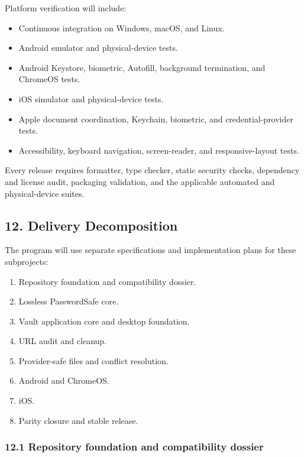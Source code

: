 \documentclass[
  letterpaper,
]{article}
\providecommand{\tightlist}{%
  \setlength{\itemsep}{0pt}\setlength{\parskip}{0pt}}
\begin{document}
Platform verification will include:

\begin{itemize}
\tightlist
\item
  Continuous integration on Windows, macOS, and Linux.
\item
  Android emulator and physical-device tests.
\item
  Android Keystore, biometric, Autofill, background termination, and ChromeOS tests.
\item
  iOS simulator and physical-device tests.
\item
  Apple document coordination, Keychain, biometric, and credential-provider tests.
\item
  Accessibility, keyboard navigation, screen-reader, and responsive-layout tests.
\end{itemize}

Every release requires formatter, type checker, static security checks, dependency and license audit, packaging
validation, and the applicable automated and physical-device suites.

\subsection{12. Delivery Decomposition}\label{12-delivery-decomposition}

The program will use separate specifications and implementation plans for these subprojects:

\begin{enumerate}
\def\labelenumi{\arabic{enumi}.}
\tightlist
\item
  Repository foundation and compatibility dossier.
\item
  Lossless PasswordSafe core.
\item
  Vault application core and desktop foundation.
\item
  URL audit and cleanup.
\item
  Provider-safe files and conflict resolution.
\item
  Android and ChromeOS.
\item
  iOS.
\item
  Parity closure and stable release.
\end{enumerate}

\subsubsection{12.1 Repository foundation and compatibility
dossier}\label{121-repository-foundation-and-compatibility-dossier}
\end{document}

